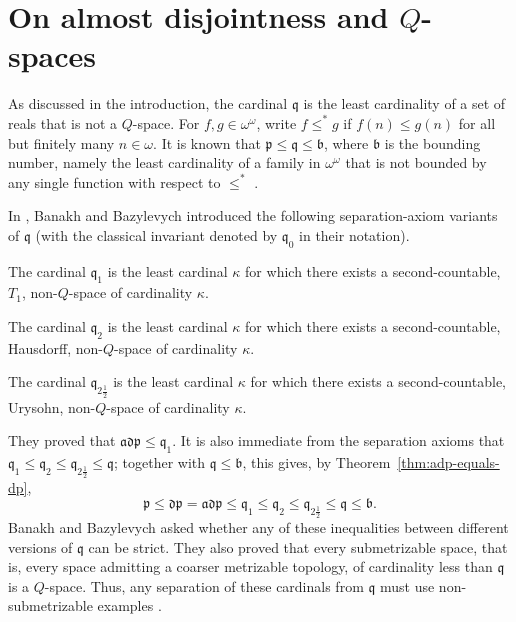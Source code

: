 \section{On almost disjointness and $Q$-spaces}\label{sec:hausdorff-q-spaces}
As discussed in the introduction, the cardinal $\mathfrak q$ is the least cardinality of a set of reals that is not a $Q$-space. For $f,g\in\omega^\omega$, write $f\leq^* g$ if $f(n)\leq g(n)$ for all but finitely many $n\in\omega$. It is known that $\mathfrak p\leq \mathfrak q\leq \mathfrak b$, where $\mathfrak b$ is the bounding number, namely the least cardinality of a family in $\omega^\omega$ that is not bounded by any single function with respect to $\leq^*$ \cite{miller1984special}.

In \cite{banakh2023q}, Banakh and Bazylevych introduced the following separation-axiom variants of $\mathfrak q$ (with the classical invariant denoted by $\mathfrak q_0$ in their notation).

\begin{definition}\label{def:q-variants}
    The cardinal $\mathfrak q_1$ is the least cardinal $\kappa$ for which there exists a second-countable, $T_1$, non-$Q$-space of cardinality $\kappa$.

    The cardinal $\mathfrak q_2$ is the least cardinal $\kappa$ for which there exists a second-countable, Hausdorff, non-$Q$-space of cardinality $\kappa$.

    The cardinal $\mathfrak q_{2\frac{1}{2}}$ is the least cardinal $\kappa$ for which there exists a second-countable, Urysohn, non-$Q$-space of cardinality $\kappa$.
\end{definition}

They proved that $\mathfrak{adp}\leq \mathfrak q_1$. It is also immediate from the separation axioms that $\mathfrak q_1\leq \mathfrak q_2\leq \mathfrak q_{2\frac{1}{2}}\leq \mathfrak q$; together with $\mathfrak q\leq\mathfrak b$, this gives, by Theorem~\ref{thm:adp-equals-dp},
\[
\mathfrak p\leq \mathfrak{dp}=\mathfrak{adp}\leq \mathfrak q_1\leq \mathfrak q_2\leq \mathfrak q_{2\frac{1}{2}}\leq \mathfrak q\leq \mathfrak b.
\]
Banakh and Bazylevych asked whether any of these inequalities between different versions of $\mathfrak q$ can be strict.
They also proved that every submetrizable space, that is, every space admitting a coarser metrizable topology, of cardinality less than $\mathfrak q$ is a $Q$-space.
Thus, any separation of these cardinals from $\mathfrak q$ must use non-submetrizable examples \cite{banakh2023q}.

